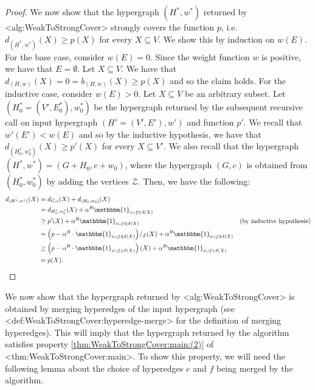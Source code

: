 \documentclass{article}
\def\Cref#1{<#1>}%
\newcommand{\zeros}{\ensuremath{\mathcal{Z}}\xspace}
\newcommand{\indicator}{\ensuremath{\mathbbm{1}}\xspace}
\newcommand{\functionContract}[2]{\ensuremath{{#1}/_{#2}}\xspace}
\begin{document}
\begin{proof}
We now show that the hypergraph $(H^*,w^*)$ returned by \Cref{alg:WeakToStrongCover} strongly covers the function $p$, i.e. $d_{(H^*, w^*)}(X) \geq p(X)$ for every $X\subseteq V$. We show this by induction on $w(E)$. For the base case, consider $w(E) = 0$. Since the weight function $w$ is positive, we have that $E = \emptyset$.
Let $X \subseteq V$. We have that $d_{(H, w)}(X) = 0 = b_{(H,w)}(X) \geq p(X)$ and so the claim holds. For the inductive case, consider $w(E) > 0$. Let $X\subseteq V$ be an arbitrary subset. 
Let $(H_0^* = (V', E_0^*), w_0^*)$ be the hypergraph returned by the subsequent recursive call on input hypergraph $(H' = (V', E'), w')$ and function $p'$. 
We recall that $w'(E') < w(E)$ and so by the inductive hypothesis, we have that $d_{(H_0^*, w_0^*)}(X) \geq p'(X)$ for every $X\subseteq V'$. We also recall that the hypergraph $(H^*, w^*) = (G+H_0, c + w_0)$, where the hypergraph $(G, c)$ is obtained from $(H_0^*, w_0^*)$ by adding the vertices $\zeros$. Then, we have the following:
\begin{align*}
    d_{(H^*, w^*)}(X)& = d_{G,c}(X) + d_{(H_0, w_0)}(X)&\\
    & = d_{H_0^*, w_0^*}(X) + \alpha^R\indicator_{e\cup f\in \delta(X)}&\\
    &\geq p'(X) + \alpha^R\indicator_{e\cup f\in \delta(X)}& \text{(by inductive hypothesis)}\\
    & = \functionContract{\left(p - \alpha^R\cdot \indicator_{e\cup f\in \delta(X)}\right)}{\zeros}(X) + \alpha^R\indicator_{e\cup f\in \delta(X)} &\\
    &\geq \left(p - \alpha^R\cdot  \indicator_{e\cup f\in \delta(X)}\right)(X) + \alpha^R\indicator_{e\cup f\in \delta(X)}&\\
    &= p(X).&
\end{align*}
\end{proof}

We now show that the hypergraph returned by \Cref{alg:WeakToStrongCover} is obtained by merging hyperedges of the input hypergraph (see \Cref{def:WeakToStrongCover:hyperedge-merge} for the definition of merging hyperedges). 
This will imply that the hypergraph returned by the algorithm satisfies property \ref{thm:WeakToStrongCover:main:(2)} of \Cref{thm:WeakToStrongCover:main}. To show this property, we will need the following lemma about the choice of hyperedges $e$ and $f$ being merged by the algorithm.
\end{document}
